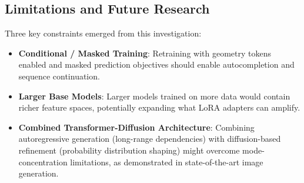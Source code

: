 \subsection{Limitations and Future Research}

Three key constraints emerged from this investigation:

\begin{itemize}
	\item \textbf{Conditional / Masked Training}: Retraining with geometry tokens enabled and masked prediction objectives should enable autocompletion and sequence continuation.
	\item \textbf{Larger Base Models}: Larger models trained on more data would contain richer feature spaces, potentially expanding what LoRA adapters can amplify.
	\item \textbf{Combined Transformer-Diffusion Architecture}: Combining autoregressive generation (long-range dependencies) with diffusion-based refinement (probability distribution shaping) might overcome mode-concentration limitations, as demonstrated in state-of-the-art image generation.
\end{itemize}

